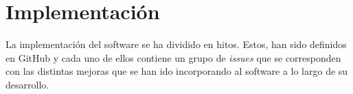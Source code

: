 \chapter{Implementación}

La implementación del software se ha dividido en hitos. Estos, han sido definidos en GitHub
y cada uno de ellos contiene un grupo de \textit{issues} que se corresponden con las distintas
mejoras que se han ido incorporando al software a lo largo de su desarrollo.\\

